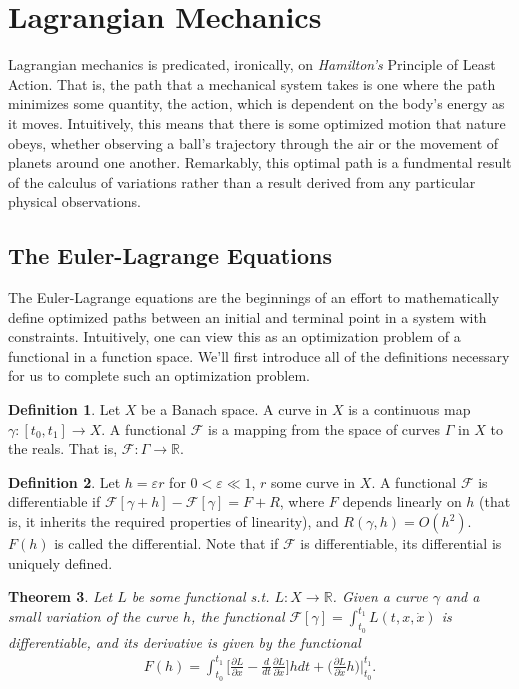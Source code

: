 \documentclass[10pt, psamsfonts]{amsart}
\newtheorem{thm}{Theorem}[section]
\theoremstyle{definition}
\newtheorem{defn}[thm]{Definition}
\theoremstyle{remark}
\numberwithin{equation}{section}
\begin{document}
\section{Lagrangian Mechanics}
Lagrangian mechanics is predicated, ironically, on \textit{Hamilton's} Principle of Least Action. That is, the path that a mechanical system takes is one where the path minimizes some quantity, the action, which is dependent on the body's energy as it moves. Intuitively, this means that there is some optimized motion that nature obeys, whether observing a ball's trajectory through the air or the movement of planets around one another. Remarkably, this optimal path is a fundmental result of the calculus of variations rather than a result derived from any particular physical observations.

\subsection{The Euler-Lagrange Equations}
The Euler-Lagrange equations are the beginnings of an effort to mathematically define optimized paths between an initial and terminal point in a system with constraints. Intuitively, one can view this as an optimization problem of a functional in a function space. We'll first introduce all of the definitions necessary for us to complete such an optimization problem. \cite{2}
\begin{defn}
  Let $X$ be a Banach space. A curve in $X$ is a continuous map $\gamma : [t_0, t_1] \to X$. A functional $\mathcal{F}$ is a mapping from the space of curves $\Gamma$ in $X$ to the reals. That is, $\mathcal{F}:\Gamma \to \mathbb{R}$.
\end{defn}
\begin{defn}
  Let $h = \varepsilon r$ for $0 < \varepsilon \ll 1$, $r$ some curve in $X$. A functional $\mathcal{F}$ is differentiable if $\mathcal{F}[\gamma + h] - \mathcal{F}[\gamma] = F + R$, where $F$ depends linearly on $h$ (that is, it inherits the required properties of linearity), and $R(\gamma, h) = O(h^2)$. $F(h)$ is called the differential. Note that if $\mathcal{F}$ is differentiable, its differential is uniquely defined.
\end{defn}

\begin{thm}
    \label{thm:1.3}
  Let $L$ be some functional s.t. $L:X\to \mathbb{R}$. Given a curve $\gamma$ and a small variation of the curve $h$, the functional $\mathcal{F}[\gamma] = \int_{t_0}^{t_1} L(t, x, \dot{x})$ is differentiable, and its derivative is given by the functional
  \begin{align*}
    F(h) = \int_{t_0}^{t_1} \bigg[\frac{\partial L}{\partial x} - \frac{d}{dt} \frac{\partial L}{\partial \dot{x}}  \bigg] h dt + \bigg(\frac{\partial L}{\partial \dot{x}}h \bigg)\bigg|_{t_0}^{t_1}.
  \end{align*}
\end{thm}
\end{document}
